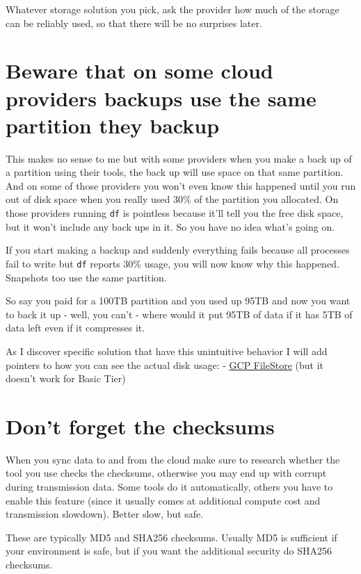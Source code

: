\documentclass[
]{report}
\begin{document}
Whatever storage solution you pick, ask the provider how much of the
storage can be reliably used, so that there will be no surprises later.

\section{Beware that on some cloud providers backups use the same
partition they
backup}\label{beware-that-on-some-cloud-providers-backups-use-the-same-partition-they-backup}

This makes no sense to me but with some providers when you make a back
up of a partition using their tools, the back up will use space on that
same partition. And on some of those providers you won't even know this
happened until you run out of disk space when you really used 30\% of
the partition you allocated. On those providers running \texttt{df} is
pointless because it'll tell you the free disk space, but it won't
include any back ups in it. So you have no idea what's going on.

If you start making a backup and suddenly everything fails because all
processes fail to write but \texttt{df} reports 30\% usage, you will now
know why this happened. Snapshots too use the same partition.

So say you paid for a 100TB partition and you used up 95TB and now you
want to back it up - well, you can't - where would it put 95TB of data
if it has 5TB of data left even if it compresses it.

As I discover specific solution that have this unintuitive behavior I
will add pointers to how you can see the actual disk usage: -
\href{https://cloud.google.com/filestore/docs/monitoring-instances\#free-raw-capacity-percent}{GCP
FileStore} (but it doesn't work for Basic Tier)

\section{Don't forget the checksums}\label{dont-forget-the-checksums}

When you sync data to and from the cloud make sure to research whether
the tool you use checks the checksums, otherwise you may end up with
corrupt during transmission data. Some tools do it automatically, others
you have to enable this feature (since it usually comes at additional
compute cost and transmission slowdown). Better slow, but safe.

These are typically MD5 and SHA256 checksums. Usually MD5 is sufficient
if your environment is safe, but if you want the additional security do
SHA256 checksums.
\end{document}
